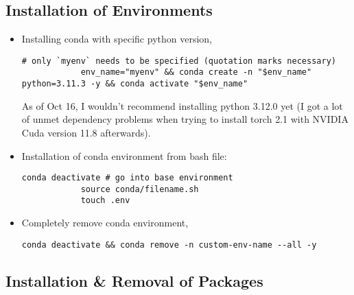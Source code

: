 \documentclass[12pt, a4paper]{article}
\numberwithin{equation}{section}
\theoremstyle{definition}
\theoremstyle{definition}
\begin{document}
	\subsection{Installation of Environments}
	
	\begin{itemize}
		\item Installing conda with specific python version,
		
		\begin{lstlisting}[style=mystylebash, label=alg:conda_env__creation_activation, xleftmargin=\parindent]
			# only `myenv` needs to be specified (quotation marks necessary)
			env_name="myenv" && conda create -n "$env_name" python=3.11.3 -y && conda activate "$env_name"
		\end{lstlisting} 
	
		As of Oct 16, I wouldn't recommend installing python 3.12.0 yet (I got a lot of unmet dependency problems when trying to install torch 2.1 with NVIDIA Cuda version 11.8 afterwards). 
		
		\item Installation of conda environment from bash file: 
		
		\begin{lstlisting}[style=mystylepython, label=alg:conda_env__from_bash, xleftmargin=\parindent]
			conda deactivate # go into base environment
			source conda/filename.sh
			touch .env 
		\end{lstlisting}
		
		\item Completely remove conda environment, 
		
		\begin{lstlisting}[style=mystylebash, label=alg:conda_removal, xleftmargin=\parindent]
			conda deactivate && conda remove -n custom-env-name --all -y 
		\end{lstlisting}
	
	\end{itemize} 
	
	\subsection{Installation \& Removal of Packages}
	
\end{document}
